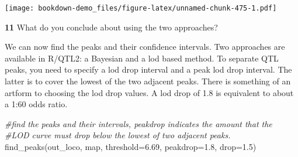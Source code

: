 \documentclass[
]{book}
\makeatletter
\newenvironment{Shaded}{\begin{snugshade}}{\end{snugshade}}
\newcommand{\AttributeTok}[1]{\textcolor[rgb]{0.77,0.63,0.00}{#1}}
\newcommand{\CommentTok}[1]{\textcolor[rgb]{0.56,0.35,0.01}{\textit{#1}}}
\newcommand{\DecValTok}[1]{\textcolor[rgb]{0.00,0.00,0.81}{#1}}
\newcommand{\FloatTok}[1]{\textcolor[rgb]{0.00,0.00,0.81}{#1}}
\newcommand{\FunctionTok}[1]{\textcolor[rgb]{0.00,0.00,0.00}{#1}}
\newcommand{\NormalTok}[1]{#1}
\newcommand{\SpecialCharTok}[1]{\textcolor[rgb]{0.00,0.00,0.00}{#1}}
\newcommand{\StringTok}[1]{\textcolor[rgb]{0.31,0.60,0.02}{#1}}
\newenvironment{kframe}{%
\medskip{}
\setlength{\fboxsep}{.8em}
 \def\at@end@of@kframe{}%
 \ifinner\ifhmode%
  \def\at@end@of@kframe{\end{minipage}}%
  \begin{minipage}{\columnwidth}%
 \fi\fi%
 \def\FrameCommand##1{\hskip\@totalleftmargin \hskip-\fboxsep
 \colorbox{shadecolor}{##1}\hskip-\fboxsep
     \hskip-\linewidth \hskip-\@totalleftmargin \hskip\columnwidth}%
 \MakeFramed {\advance\hsize-\width
   \@totalleftmargin\z@ \linewidth\hsize
   \@setminipage}}%
 {\par\unskip\endMakeFramed%
 \at@end@of@kframe}
\newenvironment{rmdblock}[1]
  {
  \begin{itemize}
  \renewcommand{\labelitemi}{
    \raisebox{-.7\height}[0pt][0pt]{
      {\setkeys{Gin}{width=3em,keepaspectratio}\texttt{[image: images/\#1]}}
    }
  }
  \setlength{\fboxsep}{1em}
  \begin{kframe}
  \item
  }
  {
  \end{kframe}
  \end{itemize}
  }
\newenvironment{rmdquiz}
  {\begin{rmdblock}{quiz}}
  {\end{rmdblock}}
\makeatother
\begin{document}
\begin{Shaded}
\end{Shaded}

\texttt{[image: bookdown-demo\_files/figure-latex/unnamed-chunk-475-1.pdf]}

\begin{rmdquiz}
\textbf{11}
What do you conclude about using the two approaches?
\end{rmdquiz}

We can now find the peaks and their confidence intervals. Two approaches are available in R/QTL2: a Bayesian and a lod based method. To separate QTL peaks, you need to specify a lod drop interval and a peak lod drop interval. The latter is to cover the lowest of the two adjacent peaks. There is something of an artform to choosing the lod drop values. A lod drop of 1.8 is equivalent to about a 1:60 odds ratio.

\begin{Shaded}
\begin{Highlighting}[]
\CommentTok{\#find the peaks and their intervals, peakdrop indicates the amount that the }
\CommentTok{\#LOD curve must drop below the lowest of two adjacent peaks.}
\FunctionTok{find\_peaks}\NormalTok{(out\_loco, map, }\AttributeTok{threshold=}\FloatTok{6.69}\NormalTok{, }\AttributeTok{peakdrop=}\FloatTok{1.8}\NormalTok{, }\AttributeTok{drop=}\FloatTok{1.5}\NormalTok{)}
\end{Highlighting}
\end{Shaded}
\end{document}

